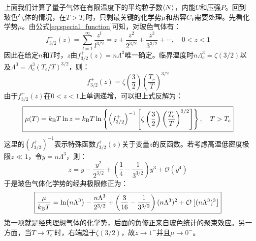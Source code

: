 上面我们计算了量子气体在有限温度下的平均粒子数$\expval{N}$，内能$U$和压强$P$。回到玻色气体的情况，在$T>T_c$时，只剩最关键的化学势$\mu$和热容$C_V$需要处理。先看化学势$\mu$。由公式\eqref{eq:special_function}可知，对玻色气体有：
\[f_{3/2}^+(z)=\sum_{l=1}^{\infty}\frac{z^l}{l^{3/2}}=z+\frac{z^2}{2^{3/2}}+\frac{z^3}{3^{3/2}}+\cdots,\quad 0<z<1\]
因此在给定$n$和$T$时，$z$由$f_{3/2}^+(z)=n\Lambda^3$唯一确定。临界温度时$n\Lambda_c^3=\zeta(3/2)$以及$\Lambda^3=\Lambda_c^3(T_c/T)^{3/2}$，则：
\[f_{3/2}^+(z)=\zeta\left(\frac{3}{2}\right)\left(\frac{T_c}{T}\right)^{3/2}\]
由于$f_{3/2}^+(z)$在$0<z<1$上单调递增，可以把上式反解为：
\begin{equation}\label{eq:mu_be}
\boxed{\mu(T)=k_{\rm B}T\ln z=k_{\rm B}T\ln\left\{\left(f_{3/2}^+\right)^{-1}\left[\zeta\left(\frac{3}{2}\right)\left(\frac{T_c}{T}\right)^{3/2}\right]\right\}, \quad T>T_c}
\end{equation}
这里的$\left(f_{3/2}^+\right)^{-1}$表示特殊函数$f_{3/2}^+(z)$关于变量$z$的反函数。若考虑高温低密度极限$z\ll1$，令$y=n\Lambda^3$，则：
\[z=y-\frac{y^2}{2^{3/2}}+\left(\frac{1}{4}-\frac{1}{3^{3/2}}\right)y^3+\mathcal{O}(y^4)\]
于是玻色气体化学势的经典极限修正为：
\[\boxed{\frac{\mu}{k_{\rm B}T}=\ln(n\Lambda^3)-\frac{n\Lambda^3}{2^{3/2}}+\left(\frac{3}{16}-\frac{1}{3^{3/2}}\right)(n\Lambda^3)^2+\mathcal{O}\left[(n\Lambda^3)^3\right]}\]
第一项就是经典理想气体的化学势，后面的负修正来自玻色统计的聚束效应。另一方面，当$T\to T_c^+$时，右端趋于$\zeta(3/2)$，故$z\to1^-$并且$\mu\to0^-$。

